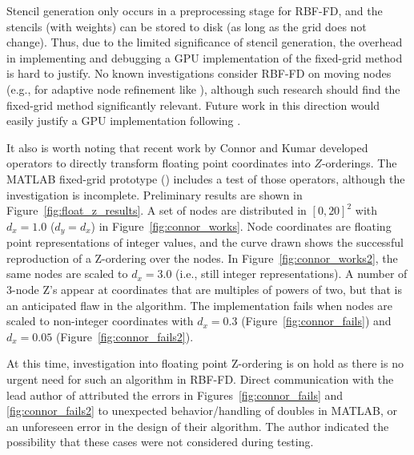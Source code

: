\documentclass{report}
\begin{document}
Stencil generation only occurs in a preprocessing stage for RBF-FD, and the stencils (with weights) can be stored to disk (as long as the grid does not change). Thus, due to the limited significance of stencil generation, the overhead in implementing and debugging a GPU implementation of the fixed-grid method is hard to justify. No known investigations consider RBF-FD on moving nodes (e.g., for adaptive node refinement like \cite{FlyerLehto10}), although such research should find the fixed-grid method significantly relevant. Future work in this direction would easily justify a GPU implementation following \cite{Krog2010,Green2010,Johnson2011, Goswami2010}. 

It also is worth noting that recent work by Connor and Kumar \cite{Connor2009} developed operators to directly transform floating point coordinates into $Z$-orderings. The MATLAB fixed-grid prototype (\cite{BolligRBFFixedGrid}) includes a test of those operators, although the investigation is incomplete. Preliminary results are shown in Figure~\ref{fig:float_z_results}. A set of nodes are distributed in $[0,20]^2$ with $d_x = 1.0$ ($d_y = d_x$) in Figure~\ref{fig:connor_works}. Node coordinates are floating point representations of integer values, and the curve drawn shows the successful reproduction of a Z-ordering over the nodes. In Figure~\ref{fig:connor_works2}, the same nodes are scaled to $d_x = 3.0$ (i.e., still integer representations). A number of 3-node Z's appear at coordinates that are multiples of powers of two, but that  is an anticipated flaw in the algorithm. The implementation fails when nodes are scaled to non-integer coordinates with $d_x = 0.3$ (Figure~\ref{fig:connor_fails}) and $d_x=0.05$ (Figure~\ref{fig:connor_fails2}). 

At this time, investigation into floating point Z-ordering is on hold as there is no urgent need for such an algorithm in RBF-FD. Direct communication with the lead author of \cite{Connor2009} attributed the errors in Figures~\ref{fig:connor_fails} and \ref{fig:connor_fails2} to unexpected behavior/handling of doubles in MATLAB, or an unforeseen error in the design of their algorithm. The author indicated the possibility that these cases were not considered during testing.
\end{document}

